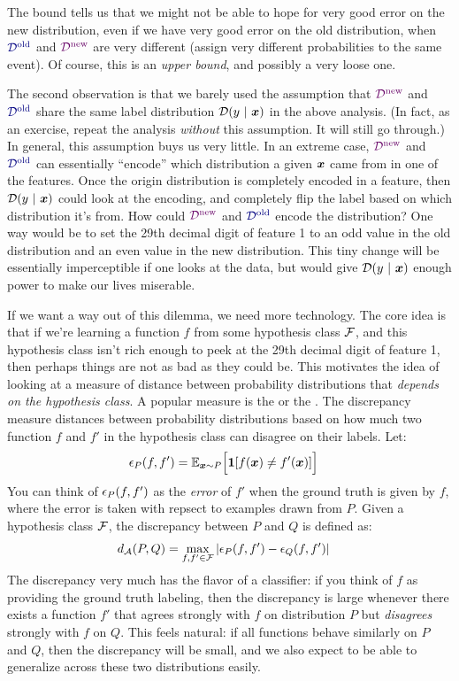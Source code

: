 The bound tells us that we might not be able to hope for very good error on the new distribution, even if we have very good error on the old distribution, when $\Dold$ and $\Dnew$ are very different (assign very different probabilities to the same event).
Of course, this is an \emph{upper bound}, and possibly a very loose one.

The second observation is that we barely used the assumption that $\Dnew$ and $\Dold$ share the same label distribution $\mathcal{D}(y \textrm{~}\arrowvert\textrm{~} {\boldsymbol{x}})$ in the above analysis. (In fact, as an exercise, repeat the analysis \emph{without} this assumption. It will still go through.)
In general, this assumption buys us very little.
In an extreme case, $\Dnew$ and $\Dold$ can essentially ``encode'' which distribution a given ${\boldsymbol{x}}$ came from in one of the features.
Once the origin distribution is completely encoded in a feature, then $\mathcal{D}(y \textrm{~}\arrowvert\textrm{~} {\boldsymbol{x}})$ could look at the encoding, and completely flip the label based on which distribution it's from.
How could $\Dnew$ and $\Dold$ encode the distribution?
One way would be to set the 29th decimal digit of feature 1 to an odd value in the old distribution and an even value in the new distribution.
This tiny change will be essentially imperceptible if one looks at the data, but would give $\mathcal{D}(y \textrm{~}\arrowvert\textrm{~} {\boldsymbol{x}})$ enough power to make our lives miserable.

If we want a way out of this dilemma, we need more technology.
The core idea is that if we're learning a function $f$ from some hypothesis class $\mathcal{F}$, and this hypothesis class isn't rich enough to peek at the 29th decimal digit of feature 1, then perhaps things are not as bad as they could be.
This motivates the idea of looking at a measure of distance between probability distributions that \emph{depends on the hypothesis class}.
A popular measure is the  or the .
The discrepancy measure distances between probability distributions based on how much two function $f$ and $f'$ in the hypothesis class can disagree on their labels.
Let:
%
\begin{align}
  \epsilon_P(f,f')
  &= \mathbb{E}_{{\boldsymbol{x}} \sim P} \Big[ \boldsymbol{1}[ f({\boldsymbol{x}}) \neq f'({\boldsymbol{x}}) ] \Big]
\end{align}
%
You can think of $\epsilon_P(f,f')$ as the \emph{error} of $f'$ when the ground truth is given by $f$, where the error is taken with repsect to examples drawn from $P$.
Given a hypothesis class $\mathcal{F}$, the discrepancy between $P$ and $Q$ is defined as:
%
\begin{align}
  d_{\mathcal{A}}(P,Q)
  &= \max_{f,f' \in \mathcal{F}} \left\vert  \epsilon_P(f,f') - \epsilon_Q(f,f')  \right\vert
\end{align}
%
The discrepancy very much has the flavor of a classifier: if you think of $f$ as providing the ground truth labeling, then the discrepancy is large whenever there exists a function $f'$ that agrees strongly with $f$ on distribution $P$ but \emph{disagrees} strongly with $f$ on $Q$.
This feels natural: if all functions behave similarly on $P$ and $Q$, then the discrepancy will be small, and we also expect to be able to generalize across these two distributions easily.

